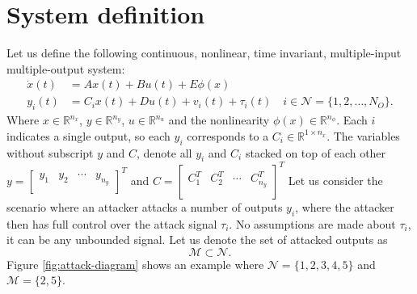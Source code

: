 \section{System definition}\label{ch:system-definition}
Let us define the following continuous, nonlinear, time invariant, multiple-input multiple-output system: 
\begin{equation}\label{eqn:standard-system}
    \begin{split}
        \dot{x}(t) &= Ax(t) + Bu(t) + E\phi(x) \\
        y_i(t) &= C_ix(t) + Du(t) + v_i(t) + \tau_i(t) \quad i \in \mathcal{N} = \{1,2,\dots,N_O\}.
    \end{split}
\end{equation}
Where $x \in \mathbb{R}^{n_x}$, $y \in \mathbb{R}^{n_y}$, $u \in \mathbb{R}^{n_u}$ and the nonlinearity $\phi(x) \in \mathbb{R}^{n_{\phi}}$. Each $i$ indicates a single output, so each $y_i$ corresponds to a $C_i \in \mathbb{R}^{1 \times n_x}$. The variables without subscript $y$ and $C$, denote all $y_i$ and $C_i$ stacked on top of each other 
$y = 
\begin{bmatrix}
    y_1 & y_2 & \cdots & y_{n_y} \\
\end{bmatrix}^{T}$ and
$C =
\begin{bmatrix}
    C_1^T & C_2^T & \cdots & C_{n_y}^T \\
\end{bmatrix}^{T}$
Let us consider the scenario where an attacker attacks a number of outputs $y_i$, where the attacker then has full control over the attack signal $\tau_i$. No assumptions are made about $\tau_i$, it can be any unbounded signal. Let us denote the set of attacked outputs as 
\begin{equation}\label{eqn:M-definition}
    \mathcal{M} \subset \mathcal{N}.
\end{equation}
Figure \ref{fig:attack-diagram} shows an example where $\mathcal{N}=\{1,2,3,4,5\}$ and $\mathcal{M} = \{2,5\}$.
